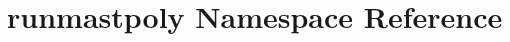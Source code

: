\hypertarget{namespacerunmastpoly}{\section{runmastpoly Namespace Reference}
\label{namespacerunmastpoly}
}
